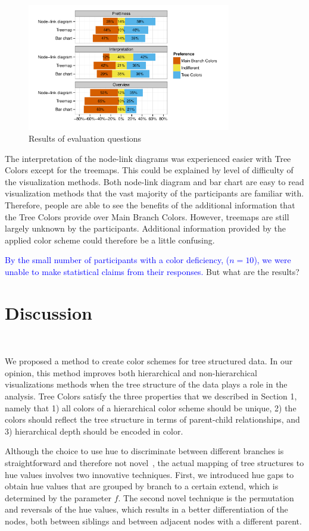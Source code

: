 \documentclass[journal]{vgtc}                %
\newcommand{\changedE}[1]{\textcolor{cornellred}{#1}}
\newcommand{\changedM}[1]{\textcolor{blue}{#1}}
\begin{document}
\begin{figure}[tb]
  \centering
	\includegraphics[width=3.5in]{user_study_results2.pdf}
  \caption{Results of evaluation questions}\label{fig:user2}
\end{figure}

The interpretation of the node-link diagrams was experienced easier with Tree Colors except for the treemaps. This could be explained by level of difficulty of the visualization methods. Both node-link diagram and bar chart are easy to read visualization methods that the vast majority of the participants are familiar with. Therefore, people are able to see the benefits of the additional information that the Tree Colors provide over Main Branch Colors. However, treemaps are still largely unknown by the participants. Additional information provided by the applied color scheme could therefore be a little confusing.

\changedM{By the small number of participants with a color deficiency, ($n=10$), we were unable to make statistical claims from their responses.} \changedE{But what are the results?}


\section{Discussion}~\label{secdisc}

We proposed a method to create color schemes for tree structured data. In our opinion, this method improves both hierarchical and non-hierarchical visualizations methods when the tree structure of the data plays a role in the analysis. Tree Colors satisfy the three properties that we described in Section 1, namely that 1) all colors of a hierarchical color scheme should be unique, 2) the colors should reflect the tree structure in terms of parent-child relationships, and 3) hierarchical depth should be encoded in color. 

Although the choice to use hue to discriminate between different branches is straightforward and therefore not novel~\cite{yang2002, lam2012}, the actual mapping of tree structures to hue values involves two innovative techniques. First, we introduced hue gaps to obtain hue values that are grouped by branch to a certain extend, which is determined by the parameter $f$. The second novel technique is the permutation and reversals of the hue values, which results in a better differentiation of the nodes, both between siblings and between adjacent nodes with a different parent.
\end{document}
